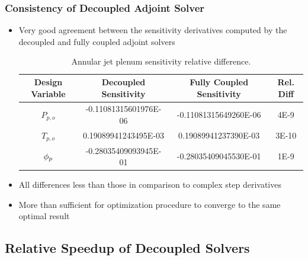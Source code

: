 \documentclass{beamer}
\begin{document}
\begin{frame}
  \frametitle{Consistency of Decoupled Adjoint Solver}
  \begin{itemize}
    \item Very good agreement between the sensitivity derivatives computed by
      the decoupled and fully coupled adjoint solvers
\begin{table}[h]
  \tiny
  \centering
  \begin{tabular}{c|c|c|c}
    Design Variable & Decoupled Sensitivity & Fully Coupled Sensitivity & Rel. Diff\\
    \hline
    $P_{p,o}$ & -0.11081315601976E-06 & -0.11081315649260E-06 & 4E-9  \\
    $T_{p,o}$ &  0.19089941243495E-03 &  0.19089941237390E-03 & 3E-10 \\
    $\phi_p$     & -0.28035409093945E-01 & -0.28035409045530E-01 & 1E-9
  \end{tabular}
  \caption{Annular jet plenum sensitivity relative difference.}
  \label{tab:srp-adj-diff}
\end{table}
    \item All differences less than those in comparison to complex step derivatives
    \item More than sufficient for optimization procedure to converge to the
      same optimal result
  \end{itemize}
\end{frame}

\subsection{Relative Speedup of Decoupled Solvers}
\end{document}
